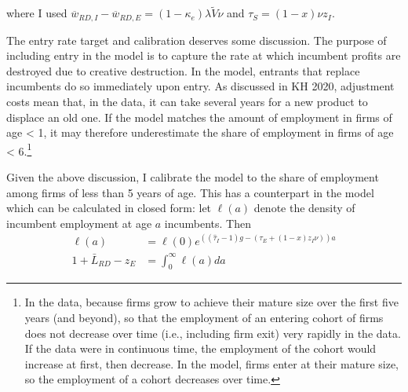 \documentclass[12pt,english]{article}
\theoremstyle{remark}
\begin{document}
where I used $\overline{w}_{RD,I} - \overline{w}_{RD,E} = (1-\kappa_e) \lambda \tilde{V} \nu$ and $\tau_S = (1-x)\nu z_I$. 

The entry rate target and calibration deserves some discussion. The purpose of including entry in the model is to capture the rate at which incumbent profits are destroyed due to creative destruction. In the model, entrants that replace incumbents do so immediately upon entry. As discussed in KH 2020, adjustment costs mean that, in the data, it can take several years for a new product to displace an old one. If the model matches the amount of employment in firms of age < 1, it may therefore underestimate the share of employment in firms of age < 6.\footnote{In the data, because firms grow to achieve their mature size over the first five years (and beyond), so that the employment of an entering cohort of firms does not decrease over time (i.e., including firm exit) very rapidly in the data. If the data were in continuous time, the employment of the cohort would increase at first, then decrease. In the model, firms enter at their mature size, so the employment of a cohort decreases over time.} 

Given the above discussion, I calibrate the model to the share of employment among firms of less than 5 years of age. This has a counterpart in the model which can be calculated in closed form: let $\ell(a)$ denote the density of incumbent employment at age $a$ incumbents. Then
\begin{align}
	\ell(a) &= \ell(0)e^{((\hat{\tau}_I -1)g - (\tau_E + (1-x)z_I \nu))a}  \\
	1 + \bar{L}_{RD} - z_E &= \int_0^{\infty} \ell(a) da
\end{align}
\end{document}

